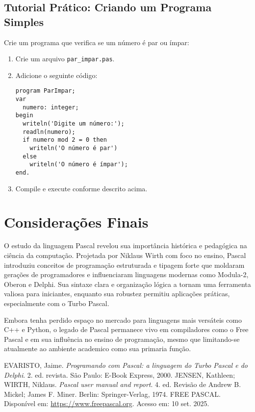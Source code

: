 \documentclass[12pt,a4paper,oneside]{abntex2}
\begin{document}
\section{Tutorial Prático: Criando um Programa Simples}
Crie um programa que verifica se um número é par ou ímpar:
\begin{enumerate}
    \item Crie um arquivo \texttt{par\_impar.pas}.
    \item Adicione o seguinte código:
\begin{verbatim}
program ParImpar;
var
  numero: integer;
begin
  writeln('Digite um número:');
  readln(numero);
  if numero mod 2 = 0 then
    writeln('O número é par')
  else
    writeln('O número é ímpar');
end.
\end{verbatim}
    \item Compile e execute conforme descrito acima.
\end{enumerate}

\chapter{Considerações Finais}
O estudo da linguagem Pascal revelou sua importância histórica e pedagógica na ciência da computação. Projetada por Niklaus Wirth com foco no ensino, Pascal introduziu conceitos de programação estruturada e tipagem forte que moldaram gerações de programadores e influenciaram linguagens modernas como Modula-2, Oberon e Delphi. Sua sintaxe clara e organização lógica a tornam uma ferramenta valiosa para iniciantes, enquanto sua robustez permitiu aplicações práticas, especialmente com o Turbo Pascal.

Embora tenha perdido espaço no mercado para linguagens mais versáteis como C++ e Python, o legado de Pascal permanece vivo em compiladores como o Free Pascal e em sua influência no ensino de programação, mesmo que limitando-se atualmente ao ambiente academico como sua primaria função.

\postextual

\begin{thebibliography}{9}
EVARISTO, Jaime. \textit{Programando com Pascal: a linguagem do Turbo Pascal e do Delphi}. 2. ed. revista. São Paulo: E-Book Express, 2000.
JENSEN, Kathleen; WIRTH, Niklaus. \textit{Pascal user manual and report}. 4. ed. Revisão de Andrew B. Mickel; James F. Miner. Berlin: Springer-Verlag, 1974.
FREE PASCAL. Disponível em: \url{https://www.freepascal.org}. Acesso em: 10 set. 2025.
\end{thebibliography}
\end{document}
